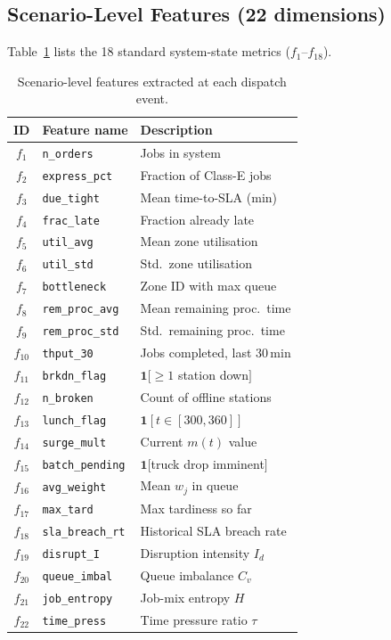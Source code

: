 \documentclass[3p,times]{elsarticle}
\begin{document}
\subsection{Scenario-Level Features (22 dimensions)}
\label{sec:scen_feat}

Table~\ref{tab:features} lists the 18 standard system-state metrics
($f_{1}$--$f_{18}$).

\begin{table}[htbp]
  \centering
  \caption{Scenario-level features extracted at each dispatch event.}
  \label{tab:features}
  \begin{tabular*}{\hsize}{@{\extracolsep{\fill}}clp{3.5cm}@{}}
    \toprule
    ID & Feature name & Description \\
    \midrule
    $f_{1}$  & \texttt{n\_orders}       & Jobs in system \\
    $f_{2}$  & \texttt{express\_pct}    & Fraction of Class-E jobs \\
    $f_{3}$  & \texttt{due\_tight}      & Mean time-to-SLA (min) \\
    $f_{4}$  & \texttt{frac\_late}      & Fraction already late \\
    $f_{5}$  & \texttt{util\_avg}       & Mean zone utilisation \\
    $f_{6}$  & \texttt{util\_std}       & Std.\ zone utilisation \\
    $f_{7}$  & \texttt{bottleneck}      & Zone ID with max queue \\
    $f_{8}$  & \texttt{rem\_proc\_avg}  & Mean remaining proc.\ time \\
    $f_{9}$  & \texttt{rem\_proc\_std}  & Std.\ remaining proc.\ time \\
    $f_{10}$ & \texttt{thput\_30}       & Jobs completed, last 30\,min \\
    $f_{11}$ & \texttt{brkdn\_flag}     & $\mathbf{1}[\geq1$ station down$]$ \\
    $f_{12}$ & \texttt{n\_broken}       & Count of offline stations \\
    $f_{13}$ & \texttt{lunch\_flag}     & $\mathbf{1}[t\in[300,360]]$ \\
    $f_{14}$ & \texttt{surge\_mult}     & Current $m(t)$ value \\
    $f_{15}$ & \texttt{batch\_pending}  & $\mathbf{1}[$truck drop imminent$]$ \\
    $f_{16}$ & \texttt{avg\_weight}     & Mean $w_{j}$ in queue \\
    $f_{17}$ & \texttt{max\_tard}       & Max tardiness so far \\
    $f_{18}$ & \texttt{sla\_breach\_rt} & Historical SLA breach rate \\
    \midrule
    $f_{19}$ & \texttt{disrupt\_I}      & Disruption intensity $I_d$ \\
    $f_{20}$ & \texttt{queue\_imbal}    & Queue imbalance $C_v$ \\
    $f_{21}$ & \texttt{job\_entropy}    & Job-mix entropy $H$ \\
    $f_{22}$ & \texttt{time\_press}     & Time pressure ratio $\tau$ \\
    \bottomrule
  \end{tabular*}
\end{table}
\end{document}
